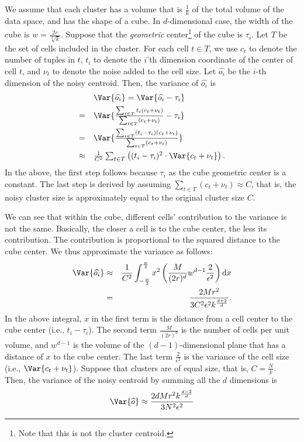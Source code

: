  We assume that each cluster has a volume that is $\frac{1}{k}$ of the total volume of the data space, and has the shape of a cube. In $d$-dimensional case, the width of the cube is $w=\frac{2r}{\sqrt[d]{k}}$. Suppose that the {\em geometric} center\footnote{Note that this is not the cluster centroid.} of the cube is $\tau_i$. Let $T$ be the set of cells included in the cluster. For each cell $t \in T$, we use $c_t$ to denote the number of tuples in $t$, $t_i$ to denote the $i$'th dimension coordinate of the center of cell $t$, and $\nu_t$ to denote the noise added to the cell size.  Let $\widehat{o_i}$ be the $i$-th dimension of the noisy centroid. Then, the variance of $\widehat{o_i}$ is
$$
\begin{array}{ll}
& \Var{\widehat{o_i}}  =   \Var{\widehat{o_i}-\tau_i}\vspace{1.5mm}
 \\
= & \Var{\frac{\sum_{t \in T} t_i (c_t + \nu_t)}{\sum_{t \in T} (c_t + \nu_t)}- \tau_i} \vspace{1.5mm}
 \\
= & \Var{\frac{\sum_{t \in T} (t_i - \tau_i) (c_t + \nu_t)}{\sum_{t \in T} (c_t + \nu_t)}}\vspace{1.5mm}
\\
\approx & \frac{1}{C^2}\sum_{t\in T} \left((t_i - \tau_i)^2 \cdot\Var{c_t + \nu_t}\right).
\\
\end{array}
$$
In the above, the first step follows because $\tau_i$ as the cube geometric center is a constant. The last step is derived by assuming $\sum_{t \in T} (c_t + \nu_t)\approx C$, that is, the noisy cluster size is approximately equal to the original cluster size $C$.

We can see that within the cube, different cells' contribution to the variance is not the same.  Basically, the closer a cell is to the cube center, the less its contribution. The contribution is proportional to the squared distance to the cube center. We thus approximate the variance as follows:
\begin{eqnarray*}
\Var{\widehat{o_i}}&\approx &\frac{1}{C^2} \int_{-\frac{w}{2}}^{\frac{w}{2}}x^2 \left(\frac{M}{(2r)^d}w^{d-1}\frac{2}{\epsilon^2}\right) \mathrm{d} x
 \\
&= & \frac{2Mr^2}{3C^2\epsilon^2k^{\frac{d+2}{d}}}.
\end{eqnarray*}
In the above integral, $x$ in the first term is the distance from a cell center to the cube center (i.e., $t_i-\tau_i$). The second term $\frac{M}{(2r)^d}$ is the number of cells per unit volume, and $w^{d-1}$ is the volume of the $(d-1)$-dimensional plane that has a distance of $x$ to the cube center. The last term $\frac{2}{\epsilon^2}$ is the variance of the cell size (i.e., $\Var{c_t + \nu_t}$). Suppose that clusters are of equal size, that is, $C=\frac{N}{k}$. Then, the variance of the noisy centroid by summing all the $d$ dimensions  is
\begin{equation}\label{eqn:nonInter_variance}
\Var{\widehat{o}}\approx\frac{2dMr^2k^{\frac{d-2}{d}}}{3N^2\epsilon^2}
\end{equation}

